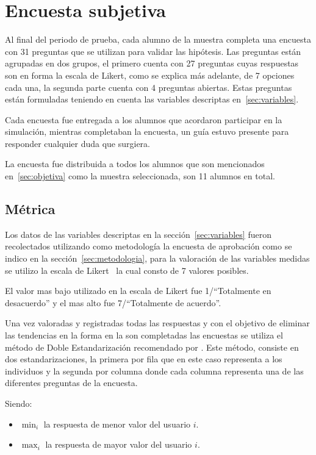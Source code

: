 \section{Encuesta subjetiva}

Al final del periodo de prueba, cada alumno de la muestra completa una encuesta
con 31 preguntas que se utilizan para validar las hipótesis. Las preguntas están
agrupadas en dos grupos, el primero cuenta con 27 preguntas cuyas respuestas son en forma la escala de  Likert, como se explica más adelante, de 7
opciones cada una, la segunda parte cuenta con 4 preguntas abiertas. Estas
preguntas están formuladas teniendo en cuenta las variables descriptas en~\ref{sec:variables}.

Cada encuesta fue entregada a los alumnos que acordaron participar en la
simulación, mientras completaban la encuesta, un guía estuvo presente para
responder cualquier duda que surgiera.

La encuesta fue distribuida a todos los alumnos que son mencionados
en~\ref{sec:objetiva} como la muestra seleccionada, son 11 alumnos en total.

\subsection{Métrica}
\label{sec:metrica}

Los datos de las variables descriptas en la sección~\ref{sec:variables} fueron
recolectados utilizando como metodología la encuesta de aprobación como se
indico en la sección~\ref{sec:metodologia}, para la valoración de las variables
medidas se utilizo la escala de Likert~\cite{Allen:2007} la cual consto de 7
valores posibles.

El valor mas bajo utilizado en la escala de Likert fue 1/``Totalmente en
desacuerdo'' y el mas alto fue 7/``Totalmente de acuerdo''.

Una vez valoradas y registradas todas las respuestas y con el objetivo de
eliminar las tendencias en la forma en la son completadas las encuestas
\cite{Fischer2010} se utiliza el método de Doble Estandarización recomendado por
\cite{Pagolu2011}. Este método, consiste en dos estandarizaciones, la primera
por fila que en este caso representa a los individuos y la segunda por columna
donde cada columna representa una de las diferentes preguntas de la encuesta.

Siendo:
\begin{itemize}
	\item $\min_i$ la respuesta de menor valor del usuario $i$.
	\item $\max_i$ la respuesta de mayor valor del usuario $i$.
\end{itemize}

